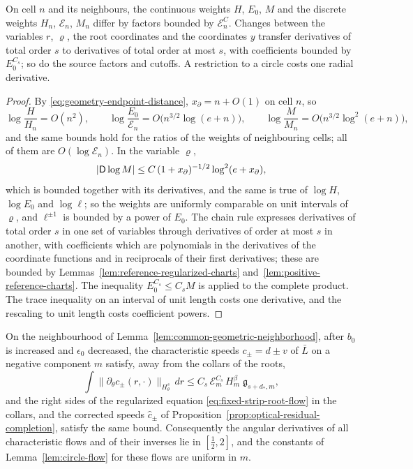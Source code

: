 \begin{lemma}
\label{lem:geometric-weight-conversion}
On cell $n$ and its neighbours, the continuous weights $H$, $E_0$,
$M$ and the discrete weights $H_n$, $\mathcal E_n$, $M_n$ differ by
factors bounded by $\mathcal E_n^{C}$. Changes between the variables
$r$, $\varrho$, the root coordinates and the coordinates $y$ transfer
derivatives of total order $s$ to derivatives of total order at most
$s$, with coefficients bounded by $E_0^{C_s}$; so do the source
factors and cutoffs. A restriction to a circle costs one radial
derivative.
\end{lemma}

\begin{proof}
By \eqref{eq:geometry-endpoint-distance},
$x_\partial=n+O(1)$ on cell $n$, so
\[
 \log\frac H{H_n}=O(n^2),\qquad
 \log\frac{E_0}{\mathcal E_n}=O\bigl(n^{3/2}\log(e+n)\bigr),\qquad
 \log\frac M{M_n}=O\bigl(n^{3/2}\log^2(e+n)\bigr),
\]
and the same bounds hold for the ratios of the weights of
neighbouring cells; all of them are $O(\log\mathcal E_n)$. In the
variable $\varrho$,
\[
 |\mathsf D\log M|\le C\,(1+x_\partial)^{-1/2}\log^2(e+x_\partial),
\]
which is bounded together with its derivatives, and the same is true
of $\log H$, $\log E_0$ and $\log\ell$; so the weights are uniformly
comparable on unit intervals of $\varrho$, and $\ell^{\pm1}$ is
bounded by a power of $E_0$. The chain rule expresses derivatives of
total order $s$ in one set of variables through derivatives of order
at most $s$ in another, with coefficients which are polynomials in the
derivatives of the coordinate functions and in reciprocals of their
first derivatives; these are bounded by
Lemmas~\ref{lem:reference-regularized-charts}
and~\ref{lem:positive-reference-charts}. The inequality
$E_0^{C_s}\le C_sM$ is applied to the complete product. The trace
inequality on an interval of unit length costs one derivative, and
the rescaling to unit length costs coefficient powers.
\end{proof}

\begin{lemma}
\label{lem:uniform-characteristic-flow-constants}
On the neighbourhood of
Lemma~\ref{lem:common-geometric-neighborhood}, after $b_0$ is
increased and $\epsilon_0$ decreased, the characteristic speeds
$c_\pm=d\pm v$ of $\bar L$ on a negative component $m$ satisfy, away
from the collars of the roots,
\begin{equation}\label{eq:geometry-flow-low-bound}
 \int\|\partial_\theta c_\pm(r,\cdot)\|_{H^s_\theta}\,dr
 \le C_s\,\mathcal E_m^{C_s}\,H_m^\beta\;\mathfrak g_{s+d_*,m},
\end{equation}
and the right sides of the regularized equation
\eqref{eq:fixed-strip-root-flow} in the collars, and the corrected
speeds $\widehat c_\pm$ of
Proposition~\ref{prop:optical-residual-completion}, satisfy the same
bound. Consequently the angular derivatives of all characteristic
flows and of their inverses lie in $[\tfrac12,2]$, and the constants
of Lemma~\ref{lem:circle-flow} for these flows are uniform in $m$.
\end{lemma}

